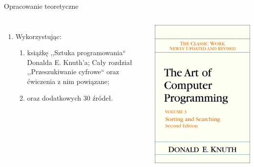 \documentclass[aspectratio=1610,english]{beamer} %
\begin{document}
\begin{frame}{Opracowanie teoretyczne}{}
\begin{columns}
\begin{enumerate}
        	        \item Wykorzystując:
                    \begin{enumerate}
                        \item książkę {\color{AGH@green},,Sztuka programowania`` Donalda E. Knuth'a}; \newline
                        {   \scriptsize \color{gray}
                                \hspace*{0.9cm} Cały rozdział ,,Przeszukiwanie cyfrowe`` oraz ćwiczenia z nim powiązane;
                        }
                        \item oraz dodatkowych {\color{AGH@green}30 źródeł}.
                    \end{enumerate}
        	    \end{enumerate}
                \includegraphics[width=\textwidth]{KnuthBookCover.png}
	    \end{columns}
	\end{frame}
\end{document}
